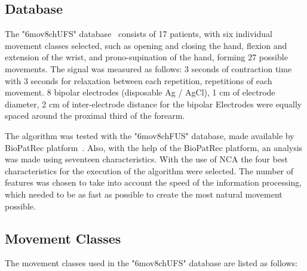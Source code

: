 \documentclass[letterpaper, 10 pt, conference]{ieeeconf}  %
\begin{document}
\subsection{Database}

The "6mov8chUFS" database~\cite{c7} consists of 17 patients, with six individual movement classes selected, such as opening and closing the hand, flexion and extension of the wrist, and prono-supination of the hand, forming 27 possible movements. The signal was measured as follows: 3 seconds of contraction time with 3 seconds for relaxation between each repetition, repetitions of each movement. 8 bipolar electrodes (disposable Ag / AgCl), 1 cm of electrode diameter, 2 cm of inter-electrode distance for the bipolar Electrodes were equally spaced around the proximal third of the forearm.

The algorithm was tested with the "6mov8chFUS" database, made available by BioPatRec platform~\cite{c8}. Also, with the help of the BioPatRec platform, an analysis was made using seventeen characteristics. With the use of NCA the four best characteristics for the execution of the algorithm were selected. The number of features was chosen to take into account the speed of the information processing, which needed to be as fast as possible to create the most natural movement possible.

\subsection{Movement Classes}

The movement classes used in the "6mov8chUFS" database are listed as follows:
\end{document}
